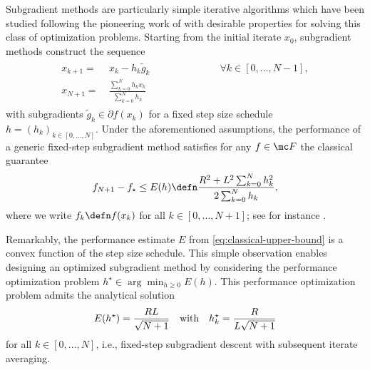 \documentclass{article}
\begin{document}
Subgradient methods are particularly simple iterative algorithms which have been studied following the pioneering work of \citet{shor1962application} with desirable properties for solving this class of optimization problems.
Starting from the initial iterate $x_0$, subgradient methods construct the sequence
\begin{align}
  \label{eq:subgradient-method}
  \begin{split}
    x_{k+1} = &~ x_{k} - h_{k} \tilde g_{k} \hspace{7em} \forall k\in [0, \dots, N-1],\\
    x_{N+1} = &~ \frac{\textstyle\sum_{k=0}^{N} h_k x_k}{\textstyle\sum^N_{k=0} h_k}
  \end{split}
\end{align}
with subgradients $\tilde g_k\in \partial f(x_k)$ for a fixed step size schedule $h = (h_k)_{k\in [0, \dots, N]}$.
Under the aforementioned assumptions, the performance of a generic fixed-step subgradient method satisfies for any $f\in \mc F$ the classical guarantee
\begin{equation}
  \label{eq:classical-upper-bound}
  f_{N+1}-f_\star \leq E(h) \defn \frac{R^2 + L^2 \textstyle\sum_{k=0}^N h^2_k}{2 \textstyle\sum_{k=0}^N h_k},
\end{equation}
where we write $f_k \defn f(x_k)$ for all $k\in [0, \dots, N+1]$; see for instance \citet{boyd2003subgradient, lan2020first}.

Remarkably, the {performance estimate} $E$ from \eqref{eq:classical-upper-bound} is a convex function of the step size schedule.
This simple observation enables designing an {optimized} subgradient method by considering the performance optimization problem
\(
h^\star\in\arg\min_{h\geq 0} E(h).
\)
This performance optimization problem admits the analytical solution
\begin{equation}
  \label{eq:classical-stepsize}
  E(h^\star) = \frac{RL}{\sqrt{N+1}} \quad {\rm{with}} \quad h^\star_k=\frac{R}{L\sqrt{N+1}}
\end{equation}
for all $k\in [0,\dots, N]$, i.e., fixed-step subgradient descent with subsequent iterate averaging.
\end{document}
